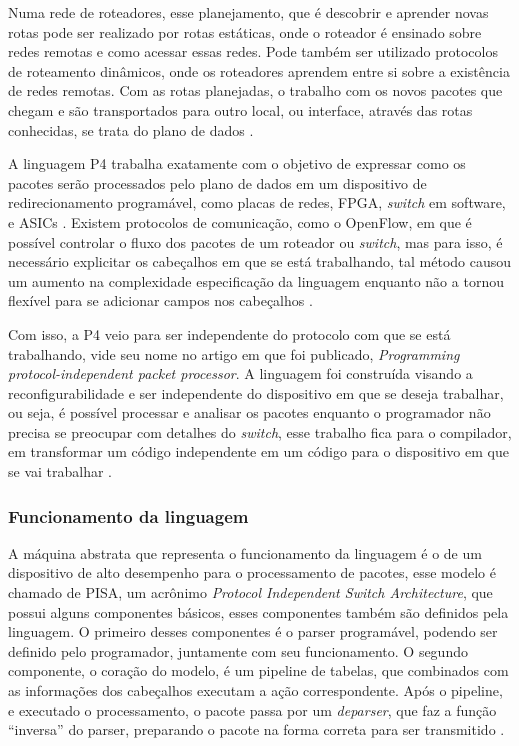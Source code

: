 \documentclass[
    12pt,
    openright, 
    oneside,
    a4paper,
    french,
    english,
    brazil
    ]{facom-ufu-abntex2}
\theoremstyle{definition}
\begin{document}
Numa rede de roteadores, esse planejamento, que é descobrir e aprender novas rotas 
pode ser realizado por rotas estáticas, onde o roteador é ensinado sobre redes remotas
e como acessar essas redes. Pode também ser utilizado protocolos de roteamento dinâmicos,
onde os roteadores aprendem entre si sobre a existência de redes remotas. Com as rotas
planejadas, o trabalho com os novos pacotes que chegam e são transportados para outro local, 
ou interface, através das rotas conhecidas, se trata do plano de dados \cite{dataVsControl}.

A linguagem P4 trabalha exatamente com o objetivo de expressar como os pacotes serão 
processados pelo plano de dados em um dispositivo de redirecionamento programável, 
como placas de redes, FPGA, \emph{switch} em software, e ASICs \cite{paxos16spec}. Existem 
protocolos de comunicação, como o OpenFlow, em que é possível controlar o fluxo dos 
pacotes de um roteador ou \emph{switch}, mas para isso, é necessário explicitar os 
cabeçalhos em que se está trabalhando, tal método causou um aumento na complexidade 
especificação da linguagem enquanto não a tornou flexível para se adicionar campos 
nos cabeçalhos \cite{bosshart2014p4}.

Com isso, a P4 veio para ser independente do protocolo com que se está trabalhando,
vide seu nome no artigo em que foi publicado, 
\emph{Programming protocol-independent packet processor}. A linguagem foi 
construída visando a reconfigurabilidade e ser independente do dispositivo em que se 
deseja trabalhar, ou seja, é possível processar e analisar os pacotes enquanto o programador
não precisa se preocupar com detalhes do \emph{switch}, esse trabalho fica para o compilador,
em transformar um código independente em um código para o dispositivo em que se vai 
trabalhar \cite{bosshart2014p4}.

\subsubsection{Funcionamento da linguagem}

A máquina abstrata que representa o funcionamento da linguagem é o de um dispositivo
de alto desempenho para o processamento de pacotes, esse modelo é chamado de PISA,
um acrônimo \emph{Protocol Independent Switch Architecture}, que possui alguns componentes
básicos, esses componentes também são definidos pela linguagem. O primeiro desses 
componentes é o parser programável, podendo ser definido pelo programador, juntamente 
com seu funcionamento. O segundo componente, o coração do modelo, é um pipeline de tabelas,
que combinados com as informações dos cabeçalhos executam a ação correspondente. Após o pipeline, e executado
o processamento, o pacote passa por um \emph{deparser}, que faz a função ``inversa''  do parser, 
preparando o pacote na forma correta para ser transmitido \cite{p4LangTutorial}.
\end{document}
